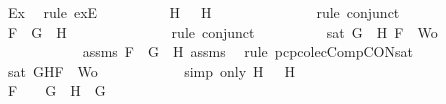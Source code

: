 \begin{isabellebody}
\ Ex{}\ \isamarkupfalse%
\ {\isacharparenleft}rule\ exE{\isacharparenright}\isanewline
\ \ \ \ \ \ \ \ \isamarkupfalse%
\ {\isachardoublequoteopen}H\ {\isacharequal}\ \isactrlbold {\isasymnot}\ H{}{\isachardoublequoteclose}\isanewline
\ \ \ \ \ \ \ \ \ \ \isamarkupfalse%
\ {}\ \isamarkupfalse%
\ {\isacharparenleft}rule\ conjunct{}{\isacharparenright}\isanewline
\ \ \ \ \ \ \ \ \isamarkupfalse%
\ {\isachardoublequoteopen}F\ {\isacharequal}\ \isactrlbold {\isasymnot}{\isacharparenleft}G\ \isactrlbold {\isasymrightarrow}\ H{}{\isacharparenright}{\isachardoublequoteclose}\isanewline
\ \ \ \ \ \ \ \ \ \ \isamarkupfalse%
\ {}\ \isamarkupfalse%
\ {\isacharparenleft}rule\ conjunct{}{\isacharparenright}\isanewline
\ \ \ \ \ \ \ \ \isamarkupfalse%
\ {\isachardoublequoteopen}sat\ {\isacharparenleft}{\isacharbraceleft}G{\isacharcomma}\ \isactrlbold {\isasymnot}\ H{}{\isacharcomma}\ F{\isacharbraceright}\ {\isasymunion}\ Wo{\isacharparenright}{\isachardoublequoteclose}\isanewline
\ \ \ \ \ \ \ \ \ \ \isamarkupfalse%
\ assms{\isacharparenleft}{}{\isacharparenright}\ {\isacartoucheopen}F\ {\isacharequal}\ \isactrlbold {\isasymnot}{\isacharparenleft}G\ \isactrlbold {\isasymrightarrow}\ H{}{\isacharparenright}{\isacartoucheclose}\ assms{\isacharparenleft}{}{\isacharcomma}{}{\isacharcomma}{}{\isacharparenright}\ \isamarkupfalse%
\ {\isacharparenleft}rule\ pcp{\isacharunderscore}colecComp{\isacharunderscore}CON{\isacharunderscore}sat{}{\isacharparenright}\isanewline
\ \ \ \ \ \ \ \ \isamarkupfalse%
\ {\isachardoublequoteopen}sat\ {\isacharparenleft}{\isacharbraceleft}G{\isacharcomma}H{\isacharcomma}F{\isacharbraceright}\ {\isasymunion}\ Wo{\isacharparenright}{\isachardoublequoteclose}\isanewline
\ \ \ \ \ \ \ \ \ \ \isamarkupfalse%
\ {\isacharparenleft}simp\ only{\isacharcolon}\ {\isacartoucheopen}H\ {\isacharequal}\ \isactrlbold {\isasymnot}\ H{}{\isacartoucheclose}{\isacharparenright}\isanewline
\ \ \ \ \ \ \isamarkupfalse%
\isanewline
\ \ \ \ \ \ \ \ \isamarkupfalse%
\ {\isachardoublequoteopen}F\ {\isacharequal}\ \isactrlbold {\isasymnot}\ {\isacharparenleft}\isactrlbold {\isasymnot}\ G{\isacharparenright}\ {\isasymand}\ H\ {\isacharequal}\ G{\isachardoublequoteclose}\isanewline

\end{isabellebody}
